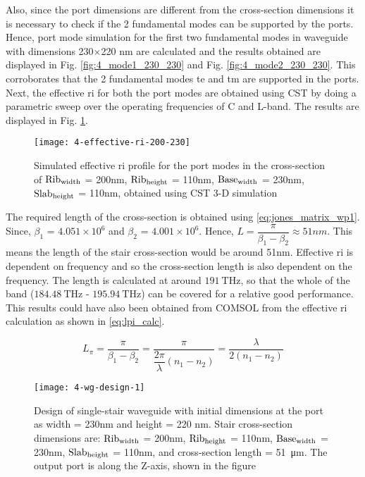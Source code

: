 \documentclass[../report.tex]{subfiles}
\begin{document}
\noindent Also, since the port dimensions are different from the cross-section dimensions it is necessary to check if the 2 fundamental modes can be supported by the ports. Hence, port mode simulation for the first two fundamental modes in waveguide with dimensions 230$\times$220 nm are calculated and the results obtained are displayed in Fig. \ref{fig:4_mode1_230_230} and Fig. \ref{fig:4_mode2_230_230}. This corroborates that the 2 fundamental modes \gls{te} and \gls{tm} are supported in the ports.\\

\noindent Next, the effective \gls{ri} for both the port modes are obtained using CST by doing a parametric sweep over the operating frequencies of C and L-band. The results are displayed in Fig. \ref{fig:4_effective_ri_200_230}. 

\begin{figure}[H] %
	\centering
	\texttt{[image: 4-effective-ri-200-230]}
	\caption{Simulated effective \gls{ri} profile for the port modes in the cross-section of $\mathrm{Rib_{width}}$ = 200nm, $\mathrm{Rib_{height}}$ = 110nm, $\mathrm{Base_{width}}$ = 230nm, $\mathrm{Slab_{height}}$ = 110nm, obtained using CST 3-D simulation}
	\label{fig:4_effective_ri_200_230}
\end{figure}

\noindent The required length of the cross-section is obtained using \ref{eq:jones_matrix_wp1}. Since, $\beta_1$ = $4.051 \times 10^6$  and $\beta_2$ = $4.001 \times 10^6$. Hence, $L = \dfrac{\pi}{\beta_1 - \beta_2} \approx 51nm$. This means the length of the stair cross-section would be around 51nm. Effective \gls{ri} is dependent on frequency and so the cross-section length is also dependent on the frequency. The length is calculated at around $\SI{191}{\THz}$, so that the whole of the band ($\SI{184.48}{\THz}$ - $\SI{195.94}{\THz}$) can be covered for a relative good performance. This results could have also been obtained from COMSOL from the effective \gls{ri} calculation as shown in \ref{eq:lpi_calc}.

\begin{equation}\label{eq:lpi_calc}
L_\pi =  \dfrac {\pi} {\beta_1 - \beta_2} = \dfrac {\pi} {\dfrac {2\pi} {\lambda}\left(n_1 - n_2\right)} = \dfrac {\lambda} {2(n_1 - n_2)}
\end{equation}

\begin{figure}[H] %
	\centering
	\texttt{[image: 4-wg-design-1]}
	\caption{Design of single-stair waveguide with initial dimensions at the port as width = 230nm and height = 220 nm. Stair cross-section dimensions are: $\mathrm{Rib_{width}}$ = 200nm, $\mathrm{Rib_{height}}$ = 110nm, $\mathrm{Base_{width}}$ = 230nm, $\mathrm{Slab_{height}}$ = 110nm, and cross-section length = \SI{51}{\micro\meter}. The output port is along the Z-axis, shown in the figure}
	\label{fig:4_wg_design_1}
\end{figure}
\end{document}
